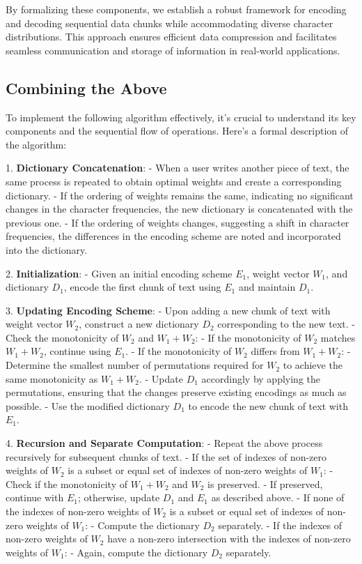 \documentclass[scrartcl]{article}
\begin{document}
By formalizing these components, we establish a robust framework for encoding and decoding sequential data chunks while accommodating diverse character distributions. This approach ensures efficient data compression and facilitates seamless communication and storage of information in real-world applications.
\subsection{Combining the Above}
To implement the following algorithm effectively, it's crucial to understand its key components and the sequential flow of operations. Here's a formal description of the algorithm:

1. \textbf{Dictionary Concatenation}:
   - When a user writes another piece of text, the same process is repeated to obtain optimal weights and create a corresponding dictionary.
   - If the ordering of weights remains the same, indicating no significant changes in the character frequencies, the new dictionary is concatenated with the previous one.
   - If the ordering of weights changes, suggesting a shift in character frequencies, the differences in the encoding scheme are noted and incorporated into the dictionary.

2. \textbf{Initialization}:
   - Given an initial encoding scheme \( E_1 \), weight vector \( W_1 \), and dictionary \( D_1 \), encode the first chunk of text using \( E_1 \) and maintain \( D_1 \).

3. \textbf{Updating Encoding Scheme}:
   - Upon adding a new chunk of text with weight vector \( W_2 \), construct a new dictionary \( D_2 \) corresponding to the new text.
   - Check the monotonicity of \( W_2 \) and \( W_1 + W_2 \):
     - If the monotonicity of \( W_2 \) matches \( W_1 + W_2 \), continue using \( E_1 \).
     - If the monotonicity of \( W_2 \) differs from \( W_1 + W_2 \):
       - Determine the smallest number of permutations required for \( W_2 \) to achieve the same monotonicity as \( W_1 + W_2 \).
       - Update \( D_1 \) accordingly by applying the permutations, ensuring that the changes preserve existing encodings as much as possible.
       - Use the modified dictionary \( D_1 \) to encode the new chunk of text with \( E_1 \).

4. \textbf{Recursion and Separate Computation}:
   - Repeat the above process recursively for subsequent chunks of text.
   - If the set of indexes of non-zero weights of \( W_2 \) is a subset or equal set of indexes of non-zero weights of \( W_1 \):
     - Check if the monotonicity of \( W_1 + W_2 \) and \( W_2 \) is preserved.
     - If preserved, continue with \( E_1 \); otherwise, update \( D_1 \) and \( E_1 \) as described above.
   - If none of the indexes of non-zero weights of \( W_2 \) is a subset or equal set of indexes of non-zero weights of \( W_1 \):
     - Compute the dictionary \( D_2 \) separately.
   - If the indexes of non-zero weights of \( W_2 \) have a non-zero intersection with the indexes of non-zero weights of \( W_1 \):
     - Again, compute the dictionary \( D_2 \) separately.
\end{document}
